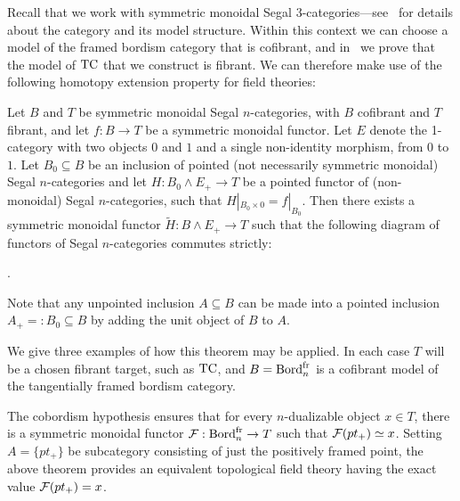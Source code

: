 \documentclass{amsart}
\begin{document}
Recall that we work with symmetric monoidal Segal $3$-categories---see~\cite{TC} for details about the category and its model structure.  Within this context we can choose a model of the framed bordism category that is cofibrant, and in~\cite{TC} we prove that the model of $\mathrm{TC}$ that we construct is fibrant.  We can therefore make use of the following homotopy extension property for field theories:
\begin{theorem}[\cite{TC}] \label{thm:HEP}
	Let $B$ and $T$ be symmetric monoidal Segal $n$-categories, with $B$ cofibrant and $T$ fibrant, and let $f: B  \to T$ be a symmetric monoidal functor. Let $E$ denote the 1-category with two objects $0$ and $1$ and a single non-identity morphism, from $0$ to $1$.  Let  $B_0 \subseteq B$ be an inclusion of pointed (not necessarily symmetric monoidal) Segal $n$-categories and let $H: B_0 \wedge E_+ \to T$ be a pointed functor of (non-monoidal) Segal $n$-categories, such that $H |_{B_0 \times 0} = f|_{B_0}$.
Then there exists a symmetric monoidal functor $\tilde{H}: B \wedge E_+ \to T$ such that the following diagram of functors of Segal $n$-categories commutes strictly:
	\begin{center}
	.
	\end{center}
\end{theorem}

Note that any unpointed inclusion $A \subseteq B$ can be made into a pointed inclusion $A_+ =: B_0 \subseteq B$ by adding the unit object of $B$ to $A$. 

We give three examples of how this theorem may be applied. In each case $T$ will be a chosen fibrant target, such as $\mathrm{TC}$, and $B = \mathrm{Bord}^\mathrm{fr}_n$ is a cofibrant model of the tangentially framed bordism category.

\begin{example}
	The cobordism hypothesis ensures that for every $n$-dualizable object $x \in T$, there is a symmetric monoidal functor $\mathcal F: \mathrm{Bord}^\mathrm{fr}_n \to T$ such that $\mathcal F(pt_+) \simeq x$. Setting $A = \{ pt_+ \}$ be subcategory consisting of just the positively framed point, the above theorem provides an equivalent topological field theory having the exact value $\mathcal F(pt_+) = x$. 	
\end{example}
\end{document}
